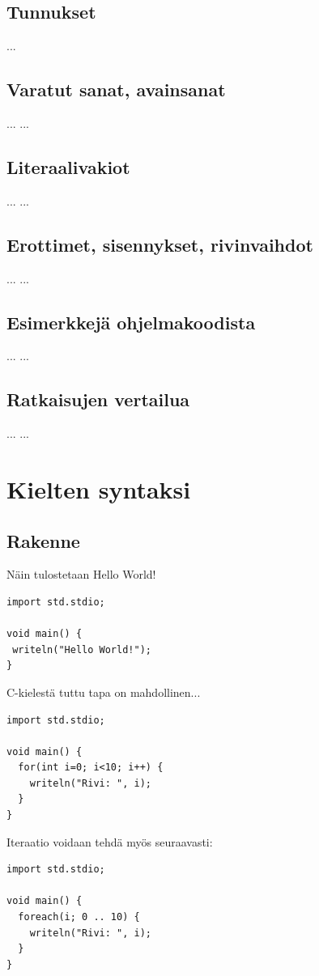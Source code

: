 \documentclass[11pt,oneside,a4paper]{article}
\begin{document}
\subsection{Tunnukset}
...
\subsection{Varatut sanat, avainsanat}
...
...
\subsection{Literaalivakiot}
...
...
\subsection{Erottimet, sisennykset, rivinvaihdot}
...
...
\subsection{Esimerkkejä ohjelmakoodista}
...
...
\subsection{Ratkaisujen vertailua}
...
...
\section{Kielten syntaksi}
\subsection{Rakenne}
Näin tulostetaan Hello World!
\begin{verbatim}
import std.stdio;

void main() {
 writeln("Hello World!");
}
\end{verbatim}
C-kielestä tuttu tapa on mahdollinen...

\begin{verbatim}
import std.stdio;

void main() {
  for(int i=0; i<10; i++) {
    writeln("Rivi: ", i);
  }
}
\end{verbatim}
Iteraatio voidaan tehdä myös seuraavasti:
\begin{verbatim}
import std.stdio;

void main() {
  foreach(i; 0 .. 10) {
    writeln("Rivi: ", i);
  }
}
\end{verbatim}
\end{document}
